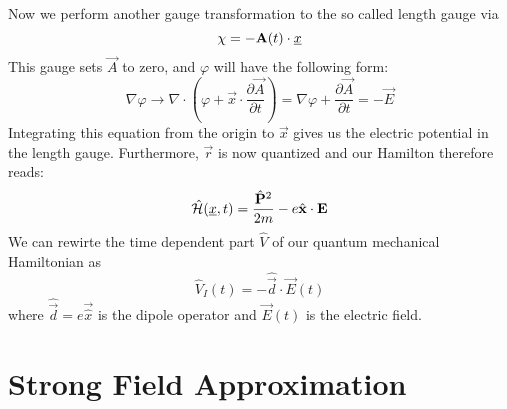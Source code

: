 Now we perform another gauge transformation to the so called length gauge via 
\begin{equation*}
    \chi = -\vec{A}(t)\cdot \uvec{x} %
\end{equation*}
This gauge sets $\vec{A}$ to zero, and $\varphi$ will have the following form:
\begin{equation*}
    \nabla \varphi \to \nabla \cdot (\varphi + \vec{x} \cdot \frac{\partial \vec{A}}{\partial t}) = \nabla \varphi + \frac{\partial \vec{A}}{\partial t} = - \vec{E}
\end{equation*}
Integrating this equation from the origin to $\vec{x}$ gives us the electric potential in the length gauge. Furthermore, $\vec{r}$ is now quantized and our Hamilton therefore reads:
\begin{equation*}
    \hat{\Hs}(\uvec{x}, t) = \frac{\hat{\vec{P}}^2}{2m} - e \hat{\vec{x}} \cdot \vec{E} %
\end{equation*}
We can rewirte the time dependent part $\hat{V}$ of our quantum mechanical Hamiltonian as
\begin{equation}
    \hat{V}_I(t) = -\hat{\vec{d}} \cdot \vec{E}(t) \label{eq:dipoleApprox}
\end{equation}
where $\hat{\vec{d}}=e\vec{\hat{x}}$ is the dipole operator and $\vec{E}(t)$ is the electric field.







\newpage
\section{Strong Field Approximation}

